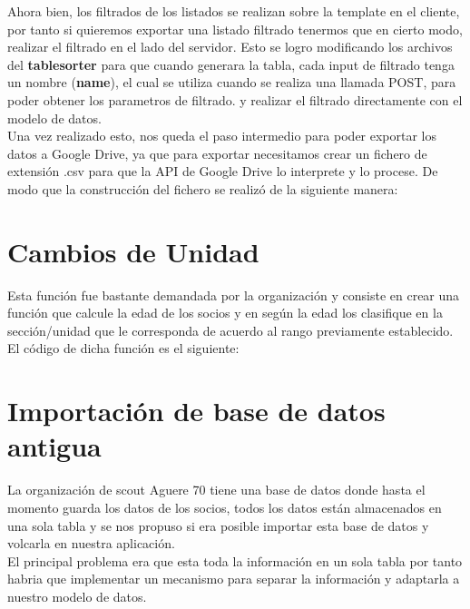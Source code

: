 Ahora bien, los filtrados de los listados se realizan sobre la template en el cliente, por tanto si quieremos exportar una listado filtrado tenermos que en cierto modo, realizar el filtrado en el lado del servidor.
Esto se logro modificando los archivos del \textbf{tablesorter} para que cuando generara la tabla, cada input de filtrado tenga un nombre (\textbf{name}), el cual se utiliza cuando se realiza una llamada POST, para poder obtener los parametros de filtrado.
y realizar el filtrado directamente con el modelo de datos.\\

Una vez realizado esto, nos queda el paso intermedio para poder exportar los datos a Google Drive, ya que para exportar necesitamos crear un fichero de extensión .csv para que la API de Google Drive lo interprete y lo procese.
De modo que la construcción del fichero se realizó de la siguiente manera:\\



\section{Cambios de Unidad}
\label{4:sec10}

Esta función fue bastante demandada por la organización y consiste en crear una función que calcule la edad de los socios y en según la edad los clasifique en la sección/unidad que le corresponda de acuerdo al rango previamente
establecido.\\

El código de dicha función es el siguiente:\\



\section{Importación de base de datos antigua}
\label{4:sec11}

La organización de scout Aguere 70 tiene una base de datos donde hasta el momento guarda los datos de los socios, todos los datos están almacenados en una sola tabla y se nos propuso si era posible importar esta base de datos
y volcarla en nuestra aplicación.\\

El principal problema era que esta toda la información en un sola tabla por tanto habria que implementar un mecanismo para separar la información y adaptarla a nuestro modelo de datos.\\

